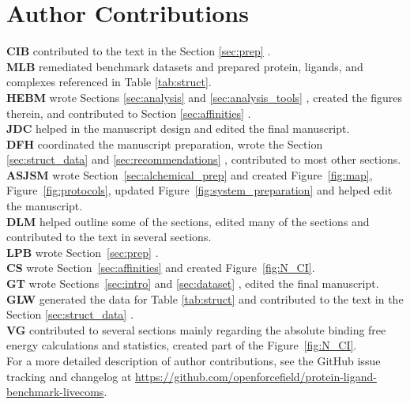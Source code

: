 \documentclass[9pt,bestpractices,pubversion]{livecoms}
\newcommand{\githubrepository}{\href{https://github.com/openforcefield/protein-ligand-benchmark-livecoms}{https://github.com/openforcefield/\hspace{0em}protein-ligand-benchmark-livecoms}}  %
\begin{document}
\section{Author Contributions}
%
  \textbf{CIB} contributed to the text in the Section \ref{sec:prep} .\\
   \textbf{MLB} remediated benchmark datasets and prepared protein, ligands, and complexes referenced in Table \ref{tab:struct}.\\
  \textbf{HEBM} wrote Sections \ref{sec:analysis}  and \ref{sec:analysis_tools} , created the figures therein, and contributed to Section \ref{sec:affinities} .\\
  \textbf{JDC} helped in the manuscript design and edited the final manuscript.\\
  \textbf{DFH} coordinated the manuscript preparation, wrote the Section \ref{sec:struct_data}   and \ref{sec:recommendations} , contributed to most other sections.\\
  \textbf{ASJSM} wrote Section~\ref{sec:alchemical_prep}  and created Figure~\ref{fig:map}, Figure~\ref{fig:protocols}, updated Figure~\ref{fig:system_preparation} and helped edit the manuscript. \\
  \textbf{DLM} helped outline some of the sections, edited many of the sections and contributed to the text in several sections. \\
  \textbf{LPB} wrote Section~\ref{sec:prep} .\\
  \textbf{CS} wrote Section~\ref{sec:affinities}  and created Figure~\ref{fig:N_CI}.\\
  \textbf{GT} wrote Sections~\ref{sec:intro}  and \ref{sec:dataset} , edited the final manuscript.\\
  \textbf{GLW} generated the data for Table \ref{tab:struct} and contributed to the text in the Section \ref{sec:struct_data}  .\\
  \textbf{VG} contributed to several sections mainly regarding the absolute binding free energy calculations and statistics, created part of the Figure~\ref{fig:N_CI}.\\
For a more detailed description of author contributions,
see the GitHub issue tracking and changelog at \githubrepository.
\end{document}
